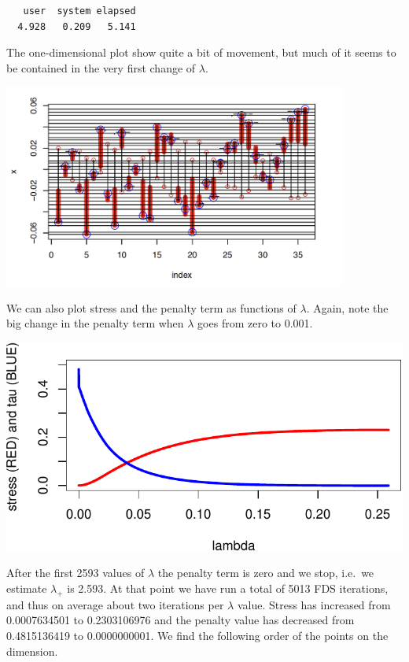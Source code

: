 \documentclass[
  12pt,
  letterpaper,
  DIV=11,
  numbers=noendperiod]{scrreprt}
\theoremstyle{remark}
\begin{document}
\begin{verbatim}
   user  system elapsed 
  4.928   0.209   5.141 
\end{verbatim}

The one-dimensional plot show quite a bit of movement, but much of it
seems to be contained in the very first change of \(\lambda\).

\begin{center}
\includegraphics[width=0.85\textwidth,height=\textheight]{graphics/morse.png}
\end{center}

We can also plot stress and the penalty term as functions of
\(\lambda\). Again, note the big change in the penalty term when
\(\lambda\) goes from zero to 0.001.

\begin{center}
\includegraphics{global_files/figure-pdf/iter-1.pdf}
\end{center}

After the first 2593 values of \(\lambda\) the penalty term is zero and
we stop, i.e.~we estimate \(\lambda_+\) is 2.593. At that point we have
run a total of 5013 FDS iterations, and thus on average about two
iterations per \(\lambda\) value. Stress has increased from 0.0007634501
to 0.2303106976 and the penalty value has decreased from 0.4815136419 to
0.0000000001. We find the following order of the points on the
dimension.
\end{document}
